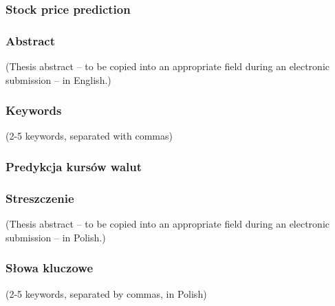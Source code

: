 \documentclass[a4paper,twoside,12pt]{book}
\newcounter{pagesWithoutNumbers}
\begin{document}
\cleardoublepage
 
\rmfamily\normalfont
\pagestyle{empty}

  

\subsubsection*{Stock price prediction} \Title

\subsubsection*{Abstract}  
(Thesis abstract – to be copied into an appropriate field during an electronic submission – in English.)

\subsubsection*{Keywords} 
(2-5 keywords, separated with commas)

\subsubsection*{Predykcja kursów walut} 
\begin{otherlanguage}{polish}
\TitleAlt
\end{otherlanguage}

\subsubsection*{Streszczenie} 
\begin{otherlanguage}{polish}
(Thesis abstract – to be copied into an appropriate field during an electronic submission – in Polish.)
\end{otherlanguage}
\subsubsection*{Słowa kluczowe}  
\begin{otherlanguage}{polish}
(2-5 keywords, separated by commas, in Polish)
\end{otherlanguage}




\thispagestyle{empty}
\tableofcontents
\thispagestyle{empty}

\setcounter{pagesWithoutNumbers}{\value{page}}
\mainmatter
\pagestyle{empty}
 
\end{document}
